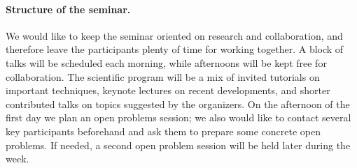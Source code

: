 \paragraph*{Structure of the seminar.}
We would like to keep the seminar oriented on research and collaboration, and therefore leave the participants plenty of time for working together.
A block of talks will be scheduled each morning, while afternoons will be kept free for collaboration.
The scientific program will be a mix of invited tutorials on important techniques, keynote lectures on recent developments, and shorter contributed talks on topics suggested by the organizers.
On the afternoon of the first day we plan an open problems session; we also would like to contact several key participants beforehand and ask them to prepare some concrete open problems.
If needed, a second open problem session will be held later during the week.
